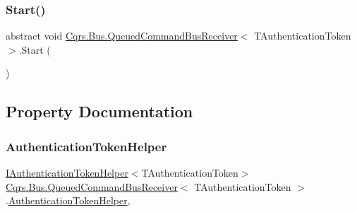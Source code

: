 \mbox{\label{classCqrs_1_1Bus_1_1QueuedCommandBusReceiver_ad8bf3c1f9d9b0444cb85784cb9e59823}} 
\subsubsection{\texorpdfstring{Start()}{Start()}}
{\footnotesize\ttfamily abstract void \hyperlink{classCqrs_1_1Bus_1_1QueuedCommandBusReceiver}{Cqrs.\+Bus.\+Queued\+Command\+Bus\+Receiver}$<$ T\+Authentication\+Token $>$.Start (\begin{DoxyParamCaption}{ }\end{DoxyParamCaption})\hspace{0.3cm}{\ttfamily [pure virtual]}}



\subsection{Property Documentation}
\mbox{\label{classCqrs_1_1Bus_1_1QueuedCommandBusReceiver_a809cb92ece6c52bbbe3abc347be0470d}} 
\subsubsection{\texorpdfstring{Authentication\+Token\+Helper}{AuthenticationTokenHelper}}
{\footnotesize\ttfamily \hyperlink{interfaceCqrs_1_1Authentication_1_1IAuthenticationTokenHelper}{I\+Authentication\+Token\+Helper}$<$T\+Authentication\+Token$>$ \hyperlink{classCqrs_1_1Bus_1_1QueuedCommandBusReceiver}{Cqrs.\+Bus.\+Queued\+Command\+Bus\+Receiver}$<$ T\+Authentication\+Token $>$.\hyperlink{classCqrs_1_1Authentication_1_1AuthenticationTokenHelper}{Authentication\+Token\+Helper}\hspace{0.3cm}{\ttfamily [get]}, {\ttfamily [protected]}}

